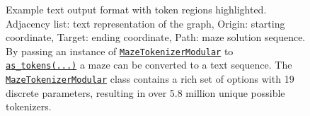 \begin{figure} 
	\centering
	\hspace{-1em}
	\begin{minipage}{5in}
	  \footnotesize
	  
	\end{minipage}
	\caption{
	  Example text output format with token regions highlighted.
	  \colorbox[RGB]{ 217,210,233 }{Adjacency list}: text representation of the graph,
	  \colorbox[RGB]{ 217,234,211 }{Origin}: starting coordinate,
	  \colorbox[RGB]{ 234,209,220 }{Target}: ending coordinate,
	  \colorbox[RGB]{ 207,226,243 }{Path}: maze solution sequence.
	  By passing an instance of \href{https://understanding-search.github.io/maze-dataset/maze_dataset/tokenization.html#MazeTokenizerModular}{\texttt{MazeTokenizerModular}} to \href{https://understanding-search.github.io/maze-dataset/maze_dataset.html#MazeDataset.as_tokens}{\texttt{as\_tokens(...)}} a maze can be converted to a text sequence. The \href{https://understanding-search.github.io/maze-dataset/maze_dataset/tokenization.html#MazeTokenizerModular}{\texttt{MazeTokenizerModular}} class contains a rich set of options with 19 discrete parameters, resulting in over 5.8 million unique possible tokenizers.
	}
	\label{fig:token-regions}
\end{figure}